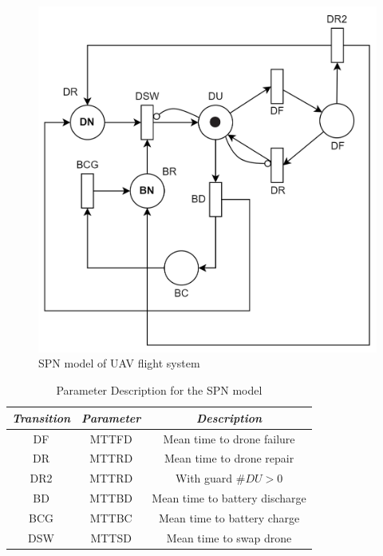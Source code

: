 \documentclass[conference]{IEEEtran}
\begin{document}
\begin{figure}[htbp]
\centerline{\includegraphics[scale=0.7]{img/SPN_transparent.png}}
\caption{SPN model of UAV flight system}
\label{fig:spn_model}
\end{figure}

\begin{table}[htbp]
\caption{Parameter Description for the SPN model}
\begin{center}
\begin{tabular}{|c|c|c|}
\hline
\textbf{\textit{Transition}} & \textbf{\textit{Parameter}}& \textbf{\textit{Description}} \\
\hline
 DF & MTTFD & Mean time to drone failure \\
 DR & MTTRD & Mean time to drone repair\\
 DR2 & MTTRD & With guard \textbf{$\#DU>0$} \\
 BD & MTTBD & Mean time to battery discharge \\ 
 BCG & MTTBC & Mean time to battery charge \\
 DSW & MTTSD & Mean time to swap drone \\
\hline
\end{tabular}
\label{tab:spn_parameter_description}
\end{center}
\end{table}
\end{document}
